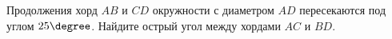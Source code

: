 \begin{ex}
	\begin{condition}
		Продолжения хорд \( AB  \) и \( CD  \) окружности с диаметром \( AD  \) пересекаются под углом \( 25\degree \). Найдите острый угол между хордами \( AC  \) и \( BD \).
	\end{condition}
\end{ex}